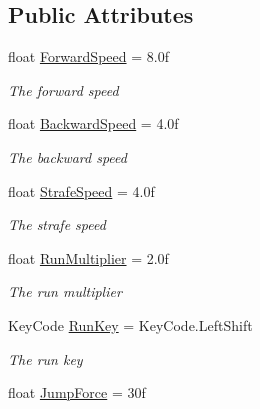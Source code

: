 \subsection*{Public Attributes}
\begin{DoxyCompactItemize}
\item 
float \hyperlink{class_lerp2_assets_1_1_characters_1_1_first_person_1_1_rigidbody_first_person_controller_1_1_movement_settings_a755bad7d8ad297ac06d48a539bb98ded}{Forward\+Speed} = 8.\+0f
\begin{DoxyCompactList}\small\item\em The forward speed \end{DoxyCompactList}\item 
float \hyperlink{class_lerp2_assets_1_1_characters_1_1_first_person_1_1_rigidbody_first_person_controller_1_1_movement_settings_af3e5b582601a131c04a59dd923451004}{Backward\+Speed} = 4.\+0f
\begin{DoxyCompactList}\small\item\em The backward speed \end{DoxyCompactList}\item 
float \hyperlink{class_lerp2_assets_1_1_characters_1_1_first_person_1_1_rigidbody_first_person_controller_1_1_movement_settings_a8b20fa6f1bf7f1fbe689fb70f132f9d8}{Strafe\+Speed} = 4.\+0f
\begin{DoxyCompactList}\small\item\em The strafe speed \end{DoxyCompactList}\item 
float \hyperlink{class_lerp2_assets_1_1_characters_1_1_first_person_1_1_rigidbody_first_person_controller_1_1_movement_settings_a67f16eddae73959e7fc3c67cf482b7ad}{Run\+Multiplier} = 2.\+0f
\begin{DoxyCompactList}\small\item\em The run multiplier \end{DoxyCompactList}\item 
Key\+Code \hyperlink{class_lerp2_assets_1_1_characters_1_1_first_person_1_1_rigidbody_first_person_controller_1_1_movement_settings_ab3194d4efc6c11a8a362d816df9424f0}{Run\+Key} = Key\+Code.\+Left\+Shift
\begin{DoxyCompactList}\small\item\em The run key \end{DoxyCompactList}\item 
float \hyperlink{class_lerp2_assets_1_1_characters_1_1_first_person_1_1_rigidbody_first_person_controller_1_1_movement_settings_acf30658f4d5ce0daca520b115a388b1e}{Jump\+Force} = 30f

\end{DoxyCompactItemize}
